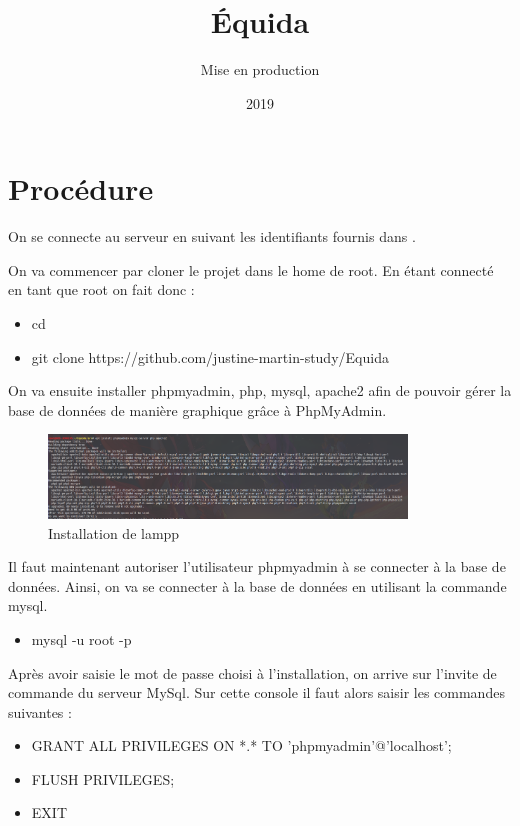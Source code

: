\documentclass[report]{BetterDocument}
\title{Équida}
\subtitle{Mise en production}
\date{2019}
\newcommand{\bdd}{base de données}
\begin{document}
	\pageDeGarde

	\chapter{Procédure}

		On se connecte au serveur en suivant les identifiants fournis dans .

		On va commencer par cloner le projet dans le home de root. En étant connecté en tant que root on fait donc :

		\begin{itemize}
			\item{cd}
			\item{git clone https://github.com/justine-martin-study/Equida}
		\end{itemize}

		On va ensuite installer phpmyadmin, php, mysql, apache2 afin de pouvoir gérer la base de données de manière graphique grâce à PhpMyAdmin.

		\begin{figure}[H]
			\centering\includegraphics[width=0.85\textwidth, keepaspectratio]{res/install-lampp.png}
			\caption{Installation de lampp}
		\end{figure}

		Il faut maintenant autoriser l'utilisateur phpmyadmin à se connecter à la \bdd{}. Ainsi, on va se connecter à la \bdd{} en utilisant la commande mysql.

		\begin{itemize}
			\item{mysql -u root -p}
		\end{itemize}

		Après avoir saisie le mot de passe choisi à l'installation, on arrive sur l'invite de commande du serveur MySql. Sur cette console il faut alors saisir les commandes suivantes :

		\begin{itemize}
			\item{GRANT ALL PRIVILEGES ON *.* TO 'phpmyadmin'@'localhost';}
			\item{FLUSH PRIVILEGES;}
			\item{EXIT}
		\end{itemize}
\end{document}
